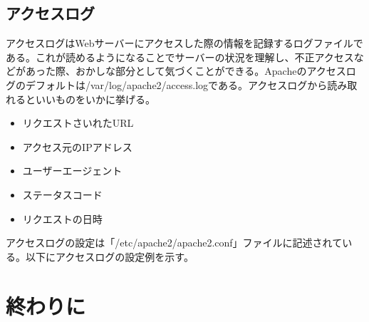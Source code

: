 \documentclass[a4paper, 11pt, dvipdfmx]{jsarticle}
\begin{document}
\subsection{アクセスログ}
アクセスログはWebサーバーにアクセスした際の情報を記録するログファイルである。これが読めるようになることでサーバーの状況を理解し、不正アクセスなどがあった際、おかしな部分として気づくことができる。Apacheのアクセスログのデフォルトは/var/log/apache2/access.logである。アクセスログから読み取れるといいものをいかに挙げる。
\begin{itemize}
  \item リクエストさいれたURL
  \item アクセス元のIPアドレス
  \item ユーザーエージェント
  \item ステータスコード
  \item リクエストの日時
\end{itemize}
アクセスログの設定は「/etc/apache2/apache2.conf」ファイルに記述されている。以下にアクセスログの設定例を示す。
\section{終わりに}
\end{document}
